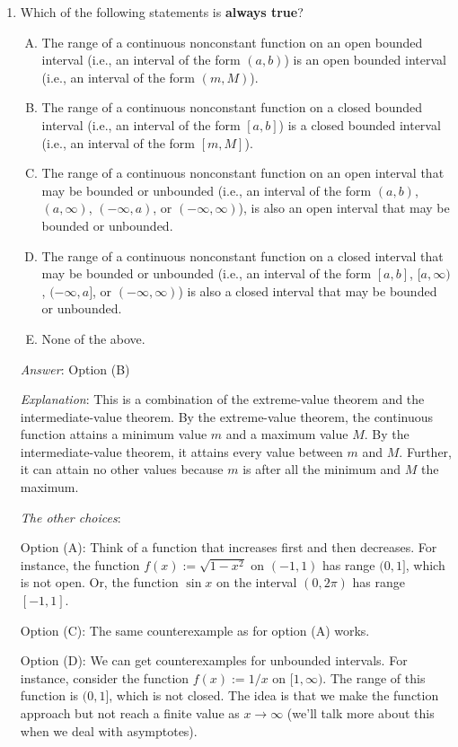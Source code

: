 \documentclass[10pt]{amsart}
\begin{document}
\begin{enumerate}
\item Which of the following statements is {\bf always true}? 

  \begin{enumerate}[(A)]
  \item The range of a continuous nonconstant function on an open
    bounded interval (i.e., an interval of the form $(a,b)$) is an
    open bounded interval (i.e., an interval of the form $(m,M)$).
  \item The range of a continuous nonconstant function on a closed
    bounded interval (i.e., an interval of the form $[a,b]$) is a
    closed bounded interval (i.e., an interval of the form $[m,M]$).
  \item The range of a continuous nonconstant function on an open
    interval that may be bounded or unbounded (i.e., an interval of
    the form $(a,b)$,$(a,\infty)$, $(-\infty,a)$, or
    $(-\infty,\infty)$), is also an open interval that may be bounded
    or unbounded.
  \item The range of a continuous nonconstant function on a closed
    interval that may be bounded or unbounded (i.e., an interval of
    the form $[a,b]$, $[a,\infty)$, $(-\infty,a]$, or
    $(-\infty,\infty)$) is also a closed interval that may be bounded
    or unbounded.
  \item None of the above.
  \end{enumerate}

  {\em Answer}: Option (B)

  {\em Explanation}: This is a combination of the extreme-value
  theorem and the intermediate-value theorem. By the extreme-value
  theorem, the continuous function attains a minimum value $m$ and a
  maximum value $M$. By the intermediate-value theorem, it attains
  every value between $m$ and $M$. Further, it can attain no other
  values because $m$ is after all the minimum and $M$ the maximum.

  {\em The other choices}:

  Option (A): Think of a function that increases first and then
  decreases. For instance, the function $f(x) := \sqrt{1 - x^2}$ on
  $(-1,1)$ has range $(0,1]$, which is not open. Or, the function
  $\sin x$ on the interval $(0,2\pi)$ has range $[-1,1]$.

  Option (C): The same counterexample as for option (A) works.

  Option (D): We can get counterexamples for unbounded intervals. For
  instance, consider the function $f(x) := 1/x$ on $[1,\infty)$. The
  range of this function is $(0,1]$, which is not closed. The idea is
  that we make the function approach but not reach a finite value as
  $x \to \infty$ (we'll talk more about this when we deal with
  asymptotes).


\end{enumerate}
\end{document}
